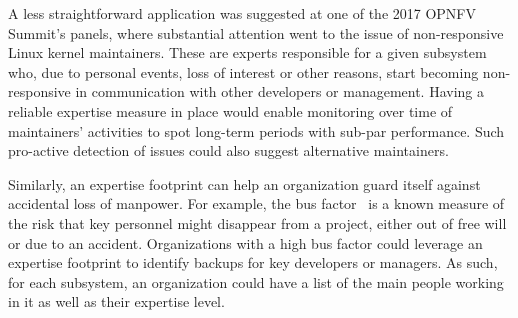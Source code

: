 A less straightforward application was suggested at one of the 2017 OPNFV Summit's panels, where substantial attention went to the issue of non-responsive Linux kernel maintainers. These are experts responsible for a given subsystem who, due to personal events, loss of interest or other reasons, start becoming non-responsive in communication with other developers or management. Having a reliable expertise measure in place would enable monitoring over time of maintainers' activities to spot long-term periods with sub-par performance. Such pro-active detection of issues could also suggest alternative maintainers.

Similarly, an expertise footprint can help an organization guard itself against accidental loss of manpower. For example, the bus factor~\cite{Mens2014} is a known measure of the risk that key personnel might disappear from a project, either out of free will or due to an accident. Organizations with a high bus factor could leverage an expertise footprint to identify backups for key developers or managers. As such, for each subsystem, an organization could have a list of the main people working in it as well as their expertise level.

